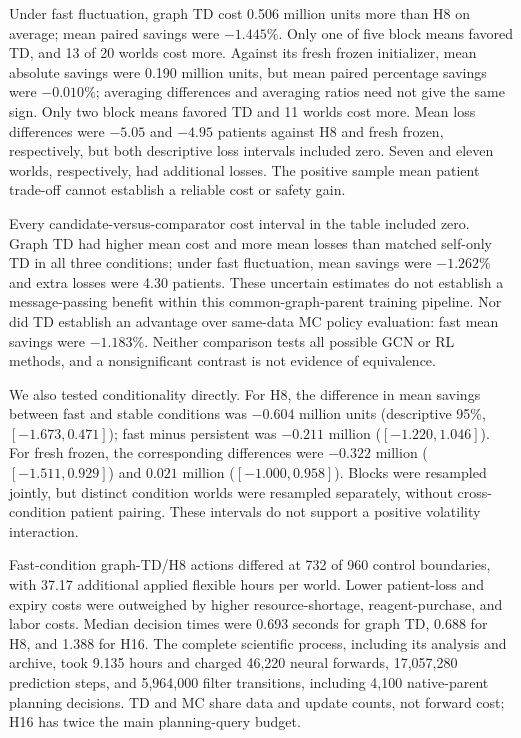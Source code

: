 \documentclass[preprint,review,12pt]{elsarticle}
\begin{document}
Under fast fluctuation, graph TD cost 0.506 million units more than H8 on
average; mean paired savings were $-1.445\%$. Only one of five block means
favored TD, and 13 of 20 worlds cost more. Against its fresh frozen initializer,
mean absolute savings were 0.190 million units, but mean paired percentage
savings were $-0.010\%$; averaging differences and averaging ratios need not
give the same sign. Only two block means favored TD and 11 worlds cost more.
Mean loss differences were $-5.05$ and $-4.95$ patients against H8 and fresh
frozen, respectively, but both descriptive loss intervals included zero.
Seven and eleven worlds, respectively, had additional losses. The positive
sample mean patient trade-off cannot establish a reliable cost or safety gain.

Every candidate-versus-comparator cost interval in the table included zero.
Graph TD had higher mean cost and more mean losses than matched self-only TD
in all three conditions; under fast fluctuation, mean savings were $-1.262\%$
and extra losses were 4.30 patients. These uncertain estimates do not establish
a message-passing benefit within this common-graph-parent training pipeline.
Nor did TD establish an advantage over same-data MC policy evaluation: fast
mean savings were $-1.183\%$. Neither comparison tests all possible GCN or RL
methods, and a nonsignificant contrast is not evidence of equivalence.

We also tested conditionality directly. For H8, the difference in mean savings
between fast and stable conditions was $-0.604$ million units (descriptive
95\%, $[-1.673,0.471]$); fast minus persistent was $-0.211$ million
($[-1.220,1.046]$). For fresh frozen, the corresponding differences were
$-0.322$ million ($[-1.511,0.929]$) and $0.021$ million
($[-1.000,0.958]$). Blocks were resampled jointly, but distinct condition
worlds were resampled separately, without cross-condition patient pairing.
These intervals do not support a positive volatility interaction.

Fast-condition graph-TD/H8 actions differed at 732 of 960 control boundaries,
with 37.17 additional applied flexible hours per world. Lower patient-loss
and expiry costs were outweighed by higher resource-shortage, reagent-purchase,
and labor costs. Median decision times were 0.693 seconds for graph TD,
0.688 for H8, and 1.388 for H16. The complete scientific process, including
its analysis and archive, took 9.135 hours and charged 46,220 neural forwards,
17,057,280 prediction steps, and 5,964,000 filter transitions, including
4,100 native-parent planning decisions. TD and MC share data and update
counts, not forward cost; H16 has twice the main planning-query budget.
\end{document}
